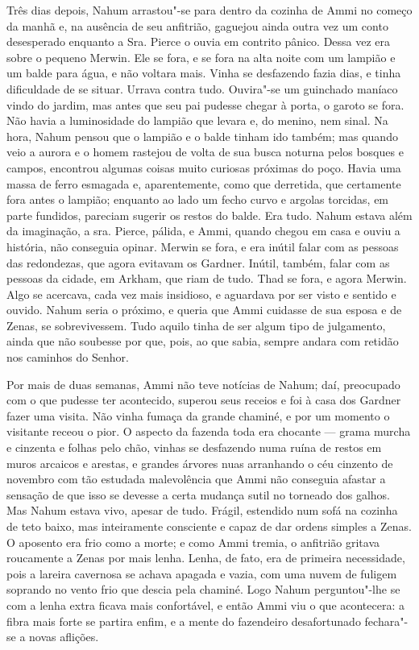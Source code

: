Três dias depois, Nahum arrastou"-se para dentro da cozinha de Ammi no
começo da manhã e, na ausência de seu anfitrião, gaguejou ainda outra
vez um conto desesperado enquanto a Sra. Pierce o ouvia em contrito
pânico. Dessa vez era sobre o pequeno Merwin. Ele se fora, e se fora na
alta noite com um lampião e um balde para água, e não voltara mais.
Vinha se desfazendo fazia dias, e tinha dificuldade de se situar. Urrava
contra tudo. Ouvira"-se um guinchado maníaco vindo do jardim, mas antes
que seu pai pudesse chegar à porta, o garoto se fora. Não havia a
luminosidade do lampião que levara e, do menino, nem sinal. Na hora,
Nahum pensou que o lampião e o balde tinham ido também; mas quando veio
a aurora e o homem rastejou de volta de sua busca noturna pelos bosques
e campos, encontrou algumas coisas muito curiosas próximas do poço.
Havia uma massa de ferro esmagada e, aparentemente, como que derretida,
que certamente fora antes o lampião; enquanto ao lado um fecho curvo e
argolas torcidas, em parte fundidos, pareciam sugerir os restos do
balde. Era tudo. Nahum estava além da imaginação, a sra. Pierce, pálida,
e Ammi, quando chegou em casa e ouviu a história, não conseguia opinar.
Merwin se fora, e era inútil falar com as pessoas das redondezas, que
agora evitavam os Gardner. Inútil, também, falar com as pessoas da
cidade, em Arkham, que riam de tudo. Thad se fora, e agora Merwin. Algo
se acercava, cada vez mais insidioso, e aguardava por ser visto e
sentido e ouvido. Nahum seria o próximo, e queria que Ammi cuidasse de
sua esposa e de Zenas, se sobrevivessem. Tudo aquilo tinha de ser algum
tipo de julgamento, ainda que não soubesse por que, pois, ao que sabia,
sempre andara com retidão nos caminhos do Senhor.

Por mais de duas semanas, Ammi não teve notícias de Nahum; daí,
preocupado com o que pudesse ter acontecido, superou seus receios e foi
à casa dos Gardner fazer uma visita. Não vinha fumaça da grande chaminé,
e por um momento o visitante receou o pior. O aspecto da fazenda toda
era chocante --- grama murcha e cinzenta e folhas pelo chão, vinhas se
desfazendo numa ruína de restos em muros arcaicos e arestas, e grandes
árvores nuas arranhando o céu cinzento de novembro com tão estudada
malevolência que Ammi não conseguia afastar a sensação de que isso se
devesse a certa mudança sutil no torneado dos galhos. Mas Nahum estava
vivo, apesar de tudo. Frágil, estendido num sofá na cozinha de teto
baixo, mas inteiramente consciente e capaz de dar ordens simples a
Zenas. O aposento era frio como a morte; e como Ammi tremia, o anfitrião
gritava roucamente a Zenas por mais lenha. Lenha, de fato, era de
primeira necessidade, pois a lareira cavernosa se achava apagada e
vazia, com uma nuvem de fuligem soprando no vento frio que descia pela
chaminé. Logo Nahum perguntou"-lhe se com a lenha extra ficava mais
confortável, e então Ammi viu o que acontecera: a fibra mais forte se
partira enfim, e a mente do fazendeiro desafortunado fechara"-se a novas
aflições.

